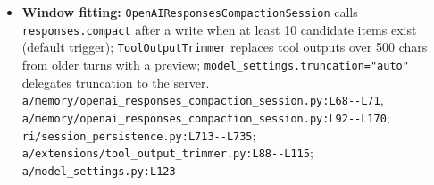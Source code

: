 \begin{itemize}
\item \textbf{Window fitting:} \texttt{OpenAIResponsesCompactionSession} calls \texttt{responses.\allowbreak{}compact} after a write when at least 10 candidate items exist (default trigger); \texttt{ToolOutputTrimmer} replaces tool outputs over 500 chars from older turns with a preview; \texttt{model\_\allowbreak{}settings.\allowbreak{}truncation="auto"} delegates truncation to the server. \texttt{a/\allowbreak{}memory/\allowbreak{}openai\_\allowbreak{}responses\_\allowbreak{}compaction\_\allowbreak{}session.\allowbreak{}py:\allowbreak{}L68-\allowbreak{}-\allowbreak{}L71}, \texttt{a/\allowbreak{}memory/\allowbreak{}openai\_\allowbreak{}responses\_\allowbreak{}compaction\_\allowbreak{}session.\allowbreak{}py:\allowbreak{}L92-\allowbreak{}-\allowbreak{}L170}; \texttt{ri/\allowbreak{}session\_\allowbreak{}persistence.\allowbreak{}py:\allowbreak{}L713-\allowbreak{}-\allowbreak{}L735}; \texttt{a/\allowbreak{}extensions/\allowbreak{}tool\_\allowbreak{}output\_\allowbreak{}trimmer.\allowbreak{}py:\allowbreak{}L88-\allowbreak{}-\allowbreak{}L115}; \texttt{a/\allowbreak{}model\_\allowbreak{}settings.\allowbreak{}py:\allowbreak{}L123}
\end{itemize}

